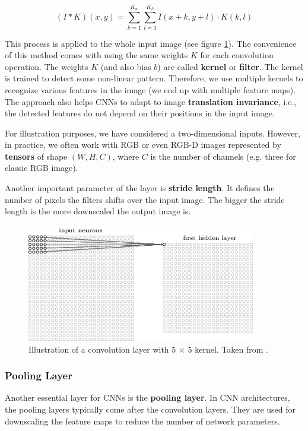 $$
    (I * K)(x, y) = \sum\limits_{k = 1}^{K_w}\sum\limits_{l = 1}^{K_h}
    I(x + k, y + l) \cdot K(k, l)
$$

This process is applied to the whole input image (see figure
\ref{fig:convolution}). The convenience of this method comes with using the same
weights $K$ for each convolution operation. The weights $K$ (and also bias $b$)
are called \textbf{kernel} or \textbf{filter}. The kernel is trained to detect
some non-linear pattern. Therefore, we use multiple kernels to recognize
various features in the image (we end up with multiple feature maps). The
approach also helps CNNs to adapt to image \textbf{translation invariance},
i.e., the detected features do not depend on their positions in the input
image.

For illustration purposes, we have considered a two-dimensional inputs. However,
in practice, we often work with RGB or even RGB-D images represented by
\textbf{tensors} of shape $(W, H, C)$, where $C$ is the number of channels (e.g.
three for classic RGB image).

Another important parameter of the layer is \textbf{stride length}. It defines
the number of pixels the filters shifts over the input image. The bigger the
stride length is the more downscaled the output image is.

\begin{figure}[h]
    \centering
    \includegraphics[width=10cm]{Sources/Figures/convolution.png}
    \caption{Illustration of a convolution layer with 5 $\times$ 5 kernel. Taken
        from \cite{nielsenneural}.}
    \label{fig:convolution}
\end{figure}

\subsubsection{Pooling Layer}
Another essential layer for CNNs is the \textbf{pooling layer}. In CNN
architectures, the pooling layers typically come after the convolution layers.
They are used for downscaling the feature maps to reduce the number of network
parameters.

